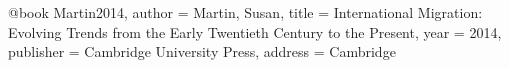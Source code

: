 ﻿@book {Martin2014,
author = {Martin, Susan},
title = {International Migration: Evolving Trends from the Early Twentieth Century to the Present},
year = {2014},
publisher = {Cambridge University Press},
address = {Cambridge}
}

